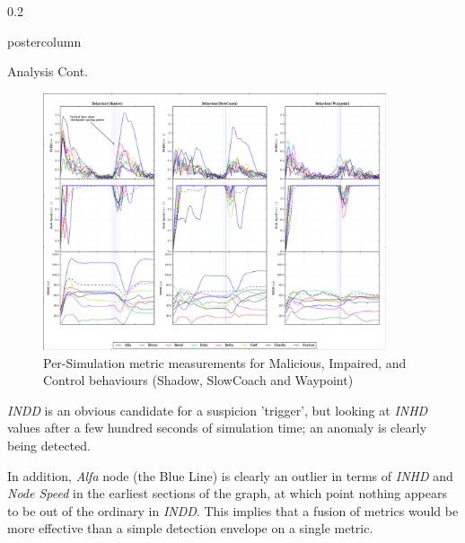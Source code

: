 \documentclass[final,hyperref={pdfpagelabels=false}]{beamer}
\def\colwidth{0.2\linewidth}
\begin{document}
\begin{frame}[fragile]
\begin{columns}[T]
    \begin{column}{\colwidth}
      \begin{beamercolorbox}[center,wd=\textwidth]{postercolumn}
        \begin{minipage}[T]{.98\textwidth} %
          \parbox[t]{\textwidth}{ %

            \begin{block}{Analysis Cont.}
                      \begin{figure}
              \includegraphics[width=0.9\textwidth]{figures/BehaviourMetricComparison}
              \caption{Per-Simulation metric measurements for Malicious, Impaired, and Control behaviours (Shadow, SlowCoach and Waypoint)}
              \label{fig:Bad_Alfa_Comparison}
            \end{figure}

            \emph{INDD} is an obvious candidate for a suspicion 'trigger', but looking at \emph{INHD} values after a few hundred seconds of simulation time; an anomaly is clearly being detected. 

            \vspace{0.3\baselineskip}

            In addition, \emph{Alfa} node (the Blue Line) is clearly an outlier in terms of \emph{INHD} and \emph{Node Speed} in the earliest sections of the graph, at which point nothing appears to be out of the ordinary in \emph{INDD}. This implies that a fusion of metrics would be more effective than a simple detection envelope on a single metric.


\end{block}}
\end{minipage}
\end{beamercolorbox}
\end{column}
\end{columns}
\end{frame}
\end{document}
